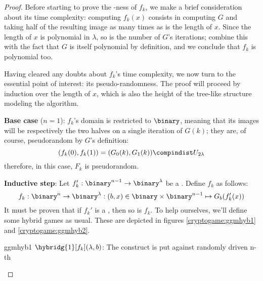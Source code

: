 \begin{proof}

    Before starting to prove the \prf-ness of $f_k$, we make a brief consideration about its time complexity: computing $f_k(x)$ consists in computing $G$ and taking half of the resulting image as many times as is the length of $x$. Since the length of $x$ is polynomial in $\lambda$, so is the number of $G$'s iterations; combine this with the fact that $G$ is itself polynomial by definition, and we conclude that $f_k$ is polynomial too.

    Having cleared any doubts about $f_k$'s time complexity, we now turn to the essential point of interest: its pseudo-randomness. The proof will proceed by induction over the length of $x$, which is also the height of the tree-like structure modeling the algorithm.
    
    \textbf{Base case} ($n = 1$): $f_k$'s domain is restricted to $\binary$, meaning that its images will be respectively the two halves on a single iteration of $G(k)$; they are, of course, pseudorandom by $G$'s definition:
    \[
        (f_k(0), f_k(1)) = (G_0(k), G_1(k)) \compindist U_{2\lambda}
    \]
    therefore, in this case, $F_k$ is pseudorandom.

    \textbf{Inductive step}: Let $f'_k : \binary^{n - 1} \to \binary^\lambda$ be a \prf. Define $f_k$ as follows:
    \[
        f_k : \binary^n \to \binary^\lambda : (b, x) \in \binary \times \binary^{n - 1} \mapsto G_b(f'_k(x))
    \]
    It must be proven that if $f_k'$ is a \prf, then so is $f_k$. To help ourselves, we'll define some hybrid games as usual. These are depicted in figures \ref{cryptogame:ggmhyb1} and \ref{cryptogame:ggmhyb2}.

    \begin{cryptogame}
        {ggmhyb1}
        {$\hybridg{1}[f_k](\lambda, b)$: The \ggm{} construct is put against randomly driven \prg}
        {n-th}


        \cseqdelay
        \cseqbeginloop
        \cseqendloop
        \cseqdelay


\end{cryptogame}
\end{proof}

